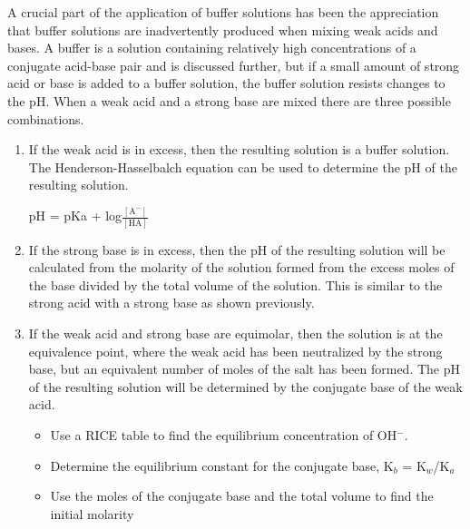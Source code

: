 \documentclass[../chem.tex]{subfiles}
\begin{document}
A crucial part of the application of buffer solutions has been the appreciation that buffer solutions are inadvertently produced when mixing 
weak acids and bases. A buffer is a solution containing relatively high concentrations of a conjugate acid-base pair and is discussed further, but if a small 
amount of strong acid or base is added to a buffer solution, the buffer solution resists changes to the pH. When a weak acid and a strong base are mixed there are three possible combinations.
\begin{enumerate}
    \item If the weak acid is in excess, then the resulting solution is a buffer solution. The Henderson-Hasselbalch equation can be used to determine the pH of the resulting solution.
    \begin{center}
        pH = pKa + log$\frac{[\text{A}^-]}{[\text{HA}]}$
    \end{center}
    \item If the strong base is in excess, then the pH of the resulting solution will be calculated from the molarity of the solution formed from the excess moles of the base divided by the total volume of the solution. This is similar to the strong acid with a strong base as shown previously.
    \item If the weak acid and strong base are equimolar, then the solution is at the equivalence point, where the weak acid has been neutralized by the strong base, but an equivalent number of moles of the salt has been formed. The pH of the resulting solution will be determined by the conjugate base of the weak acid.
    \begin{itemize}
        \item Use a RICE table to find the equilibrium concentration of OH$^-$.
        \item Determine the equilibrium constant for the conjugate base, K$_b$ = K$_w$/K$_a$
        \item Use the moles of the conjugate base and the total volume to find the initial molarity
    \end{itemize}
\end{enumerate}
\end{document}
